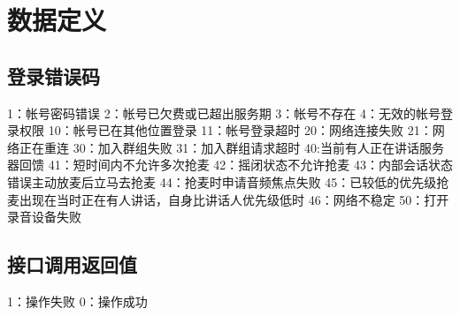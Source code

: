 \documentclass[letterpaper,10pt,english]{sphinxmanual}
\begin{document}
\begin{sphinxVerbatim}[commandchars=\\\{\}]
     
     
     
      

     
     
     
      
\end{sphinxVerbatim}


\section{数据定义}
\label{\detokenize{csharp:id89}}

\subsection{登录错误码}
\label{\detokenize{csharp:id90}}
%
\begin{sphinxVerbatim}[commandchars=\\\{\}]
\PYGZhy{}1：帐号密码错误
\PYGZhy{}2：帐号已欠费或已超出服务期
\PYGZhy{}3：帐号不存在
\PYGZhy{}4：无效的帐号登录权限
\PYGZhy{}10：帐号已在其他位置登录
\PYGZhy{}11：帐号登录超时
\PYGZhy{}20：网络连接失败
\PYGZhy{}21：网络正在重连
\PYGZhy{}30：加入群组失败
\PYGZhy{}31：加入群组请求超时
\PYGZhy{}40:当前有人正在讲话\PYGZlt{}服务器回馈\PYGZgt{}
\PYGZhy{}41：短时间内不允许多次抢麦
\PYGZhy{}42：摇闭状态不允许抢麦
\PYGZhy{}43：内部会话状态错误\PYGZlt{}主动放麦后立马去抢麦\PYGZgt{}
\PYGZhy{}44：抢麦时申请音频焦点失败
\PYGZhy{}45：已较低的优先级抢麦\PYGZlt{}出现在当时正在有人讲话，自身比讲话人优先级低时\PYGZgt{}
\PYGZhy{}46：网络不稳定
\PYGZhy{}50：打开录音设备失败
\end{sphinxVerbatim}


\subsection{接口调用返回值}
\label{\detokenize{csharp:id91}}
%
\begin{sphinxVerbatim}[commandchars=\\\{\}]
\PYGZhy{}1：操作失败
 0：操作成功
\end{sphinxVerbatim}
\end{document}
